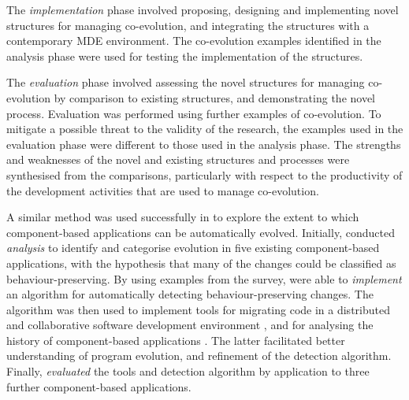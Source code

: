 The \emph{implementation} phase involved proposing, designing and implementing novel structures for managing co-evolution, and integrating the structures with a contemporary MDE environment. The co-evolution examples identified in the analysis phase were used for testing the implementation of the structures.

The \emph{evaluation} phase involved assessing the novel structures for managing co-evolution by comparison to existing structures, and demonstrating the novel process. Evaluation was performed using further examples of co-evolution. To mitigate a possible threat to the validity of the research, the examples used in the evaluation phase were different to those used in the analysis phase. The strengths and weaknesses of the novel and existing structures and processes were synthesised from the comparisons, particularly with respect to the productivity of the development activities that are used to manage co-evolution.

A similar method was used successfully in \cite{dig07thesis} to explore the extent to which component-based applications can be automatically evolved. Initially, \cite{dig06apis} conducted \emph{analysis} to identify and categorise evolution in five existing component-based applications, with the hypothesis that many of the changes could be classified as behaviour-preserving. By using examples from the survey, \cite{dig06detection} were able to \emph{implement} an algorithm for automatically detecting behaviour-preserving changes. The algorithm was then used to implement tools for migrating code in a distributed and collaborative software development environment \cite{dig06automatic}, and for analysing the history of component-based applications \cite{dig07cms}. The latter facilitated better understanding of program evolution, and refinement of the detection algorithm. Finally, \cite{dig07thesis} \emph{evaluated} the tools and detection algorithm by application to three further component-based applications.